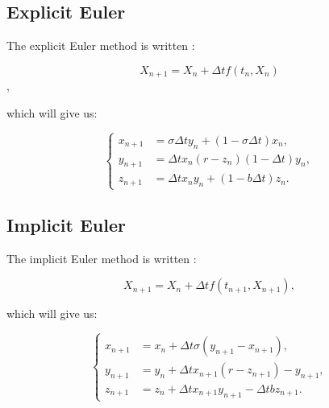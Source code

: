 \documentclass[12pt]{article}
\begin{document}
	\subsection{Explicit Euler}
	
	The explicit Euler method is written :
	
	$$X_{n+1}=X_n+\Delta t f(t_n,X_n)$$,
	
	\noindent which will give us:
	
	$$\left\{\begin{aligned} 
		x_{n+1}&=\sigma\Delta t y_n+(1-\sigma\Delta t) x_n ,\\
		y_{n+1}&=\Delta t x_n(r-z_n)(1-\Delta t)y_n ,\\
		z_{n+1}&=\Delta t x_ny_n+(1-b\Delta t)z_n.
	\end{aligned}\right.$$
	
	\subsection{Implicit Euler}
	
	The implicit Euler method is written :
	
	$$X_{n+1}=X_n+\Delta t f(t_{n+1},X_{n+1}),$$
	
	\noindent which will give us:
	
	$$\left\{\begin{aligned} 
		x_{n+1}&=x_n+\Delta t\sigma(y_{n+1}-x_{n+1}), \\
		y_{n+1}&=y_n+\Delta t x_{n+1}(r-z_{n+1})-y_{n+1}, \\
		z_{n+1}&=z_n+\Delta tx_{n+1}y_{n+1}-\Delta tbz_{n+1}.
	\end{aligned}\right.$$
	
\end{document}
